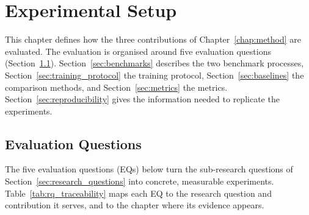 
\chapter{Experimental Setup}
\label{chap:experimental_setup}

This chapter defines how the three contributions of
Chapter~\ref{chap:method} are evaluated. The evaluation is organised
around five evaluation questions (Section~\ref{sec:experimental_objectives}).
Section~\ref{sec:benchmarks} describes the two benchmark processes,
Section~\ref{sec:training_protocol} the training protocol,
Section~\ref{sec:baselines} the comparison methods, and
Section~\ref{sec:metrics} the metrics. Section~\ref{sec:reproducibility}
gives the information needed to replicate the experiments.

\section{Evaluation Questions}
\label{sec:experimental_objectives}

The five evaluation questions (EQs) below turn the sub-research
questions of Section~\ref{sec:research_questions} into concrete,
measurable experiments. Table~\ref{tab:rq_traceability} maps each EQ to
the research question and contribution it serves, and to the chapter
where its evidence appears.

